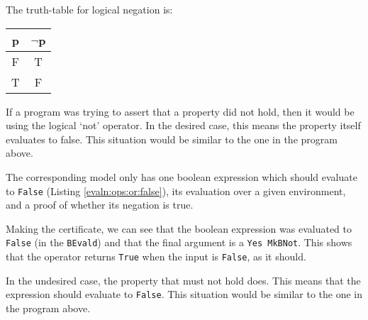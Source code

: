         The truth-table for logical negation is:
        \begin{center}
            \begin{tabular}{c | c}
                p & $\lnot$p \\
                \hline
                F & T \\
                T & F \\
            \end{tabular}
        \end{center}
        
        \newpage
        
        
        
        If a program was trying to assert that a property did not hold, then it would be using the logical `not' operator. In the desired case, this means the property itself evaluates to false. This situation would be similar to the one in the program above.
        
        
        The corresponding \Idris model only has one boolean expression which should evaluate to \texttt{False} (Listing \ref{evaln:ops:or:false}), its evaluation over a given environment, and a proof of whether its negation is true.
        
        \newpage
        
        
        Making the certificate, we can see that the boolean expression was evaluated to \texttt{False} (in the \texttt{BEvald}) and that the final argument is a \texttt{Yes MkBNot}. This shows that the operator returns \texttt{True} when the input is \texttt{False}, as it should.
        
        
        
        In the undesired case, the property that must not hold does. This means that the expression should evaluate to \texttt{False}. This situation would be similar to the one in the program above.
        
        
